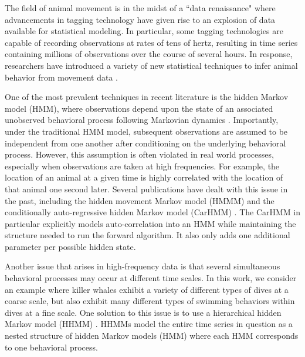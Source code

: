 

The field of animal movement is in the midst of a ``data renaissance" where advancements in tagging technology have given rise to an explosion of data available for statistical modeling. In particular, some tagging technologies are capable of recording observations at rates of tens of hertz, resulting in time series containing millions of observations over the course of several hours. In response, researchers have introduced a variety of new statistical techniques to infer animal behavior from movement data \citep{Hooten:2017}. 

One of the most prevalent techniques in recent literature is the hidden Markov model (HMM), where observations depend upon the state of an associated unobserved behavioral process following Markovian dynamics \citep{Patterson:2017}. Importantly, under the traditional HMM model, subsequent observations are assumed to be independent from one another after conditioning on the underlying behavioral process. However, this assumption is often violated in real world processes, especially when observations are taken at high frequencies. For example, the location of an animal at a given time is highly correlated with the location of that animal one second later. Several publications have dealt with this issue in the past, including the hidden movement Markov model (HMMM) \citep{Whoriskey:2016} and the conditionally auto-regressive hidden Markov model (CarHMM) \citep{Lawler:2019}. The CarHMM in particular explicitly models auto-correlation into an HMM while maintaining the structure needed to run the forward algorithm. It also only adds one additional parameter per possible hidden state.

Another issue that arises in high-frequency data is that several simultaneous behavioral processes may occur at different time scales. In this work, we consider an example where killer whales exhibit a variety of different types of dives at a coarse scale, but also exhibit many different types of swimming behaviors within dives at a fine scale. One solution to this issue is to use a hierarchical hidden Markov model (HHMM) \citep{Barajas:2017} \citep{Adam:2019}. HHMMs model the entire time series in question as a nested structure of hidden Markov models (HMM) where each HMM corresponds to one behavioral process.

